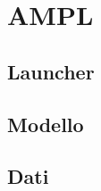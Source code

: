 \documentclass[main.tex]{subfiles}
\begin{document}
\section{AMPL}

\subsection{Launcher}

\subsection{Modello}

\subsection{Dati}
\end{document}
